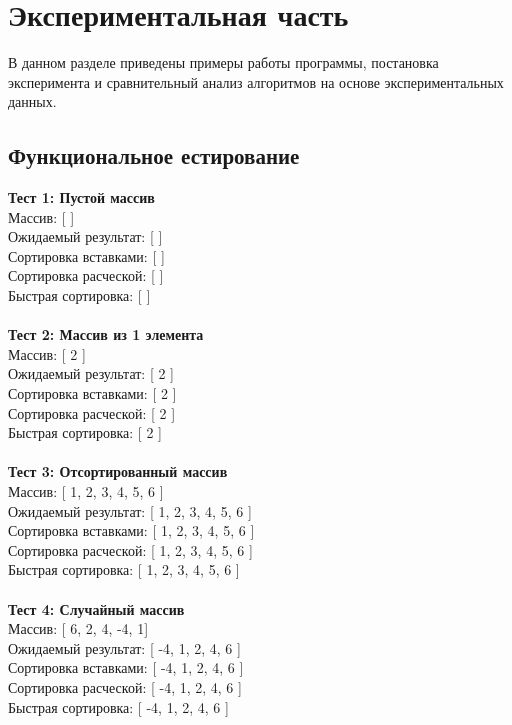 \documentclass[a4paper,12pt]{report}
\begin{document}
\chapter{Экспериментальная часть}
В данном разделе приведены примеры работы программы, постановка эксперимента и сравнительный анализ алгоритмов на основе экспериментальных данных.
\section{Функциональное естирование}
\hspace{0.6cm}\textbf {Тест 1: Пустой массив}\\
Массив: [ ]\\
Ожидаемый результат: [ ]\\
Сортировка вставками: [ ]\\
Сортировка расческой: [ ]\\
Быстрая сортировка: [ ]\\\\

\textbf {Тест 2: Массив из 1 элемента}\\
Массив: [ 2 ]\\
Ожидаемый результат: [ 2 ]\\
Сортировка вставками: [ 2 ]\\
Сортировка расческой: [ 2 ]\\
Быстрая сортировка: [ 2 ]\\\\

\textbf {Тест 3: Отсортированный массив}\\
Массив: [ 1, 2, 3, 4, 5, 6 ]\\
Ожидаемый результат: [ 1, 2, 3, 4, 5, 6 ]\\
Сортировка вставками: [ 1, 2, 3, 4, 5, 6 ]\\
Сортировка расческой: [ 1, 2, 3, 4, 5, 6 ]\\
Быстрая сортировка: [ 1, 2, 3, 4, 5, 6 ]\\\\

\textbf {Тест 4: Случайный массив}\\
Массив: [ 6, 2, 4, -4, 1]\\
Ожидаемый результат: [ -4, 1, 2, 4, 6 ]\\
Сортировка вставками: [ -4, 1, 2, 4, 6 ]\\
Сортировка расческой: [ -4, 1, 2, 4, 6 ]\\
Быстрая сортировка: [ -4, 1, 2, 4, 6 ]\\\\
\end{document}
